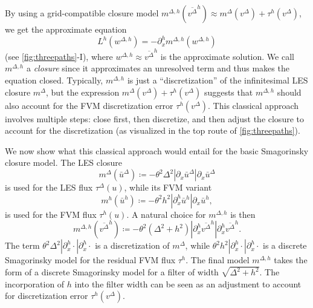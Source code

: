 \documentclass[preprint,twocolumn,5p]{elsarticle}
\begin{document}
By using a grid-compatible closure model
$m^{\Delta, h}(\overline{v^\Delta}^h) \approx m^\Delta(v^\Delta) +
\tau^h(v^\Delta)$, we get the approximate equation
\begin{equation} \label{eq:classical-discrecte-les}
    L^h(w^{\Delta, h}) = - \partial^h_x m^{\Delta, h}(w^{\Delta, h})
\end{equation}
(see \cref{fig:threepaths}-I),
where $w^{\Delta, h} \approx \overline{v^\Delta}^h$
is the approximate solution.
We call $m^{\Delta, h}$ a \emph{closure} since it approximates an unresolved
term and thus makes the equation closed. Typically, $m^{\Delta, h}$ is
just a ``discretization'' of the infinitesimal LES closure $m^\Delta$,
but the expression $m^\Delta(v^\Delta) + \tau^h(v^\Delta)$
suggests that $m^{\Delta, h}$ should also account for
the FVM discretization error $\tau^h(v^\Delta)$.
This classical approach involves multiple steps:
close first, then discretize,
and then adjust the closure to account for the
discretization (as visualized in the top route of \cref{fig:threepaths}).

We now show what this classical approach would entail for the 
basic Smagorinsky closure model.
The LES closure
\begin{equation}
    m^\Delta(\bar{u}^\Delta) \coloneq -\theta^2 \Delta^2
    \left| \partial_x \bar{u}^\Delta \right| \partial_x \bar{u}^\Delta
\end{equation}
is used for the LES flux $\tau^\Delta(u)$, while its FVM variant
\begin{equation}
    m^h(\bar{u}^h) \coloneq -\theta^2 h^2
    \left| \partial^h_x \bar{u}^h \right| \partial_x \bar{u}^h,
\end{equation}
is used for the FVM flux $\tau^h(u)$.
A natural choice for $m^{\Delta, h}$ is then
\begin{equation}
    m^{\Delta, h}(\overline{v^\Delta}^h) \coloneq
    -\theta^2 (\Delta^2 + h^2)
    \left| \partial^h_x \overline{v^\Delta}^h \right|
    \partial^h_x \overline{v^\Delta}^h.
\end{equation}
The term
$\theta^2 \Delta^2 |\partial^h_x \cdot | \partial^h_x \cdot$
is a discretization of $m^\Delta$, while
$\theta^2 h^2 |\partial^h_x \cdot | \partial^h_x \cdot$
is a discrete Smagorinsky model for the residual FVM flux $\tau^h$.
The final model $m^{\Delta, h}$ takes the form of a discrete Smagorinsky model 
for a filter of width $\sqrt{\Delta^2 + h^2}$.
The incorporation of $h$ into the filter width can be seen as an adjustment
to account for discretization error $\tau^h(v^\Delta)$.
\end{document}
